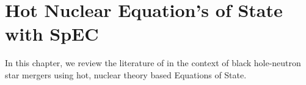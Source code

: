 \chapter{Hot Nuclear Equation's of State with SpEC}
\label{chap:chapter-4}

In this chapter, we review the literature of \SpEC in the context of black hole-neutron star mergers using hot, nuclear theory based Equations of State.